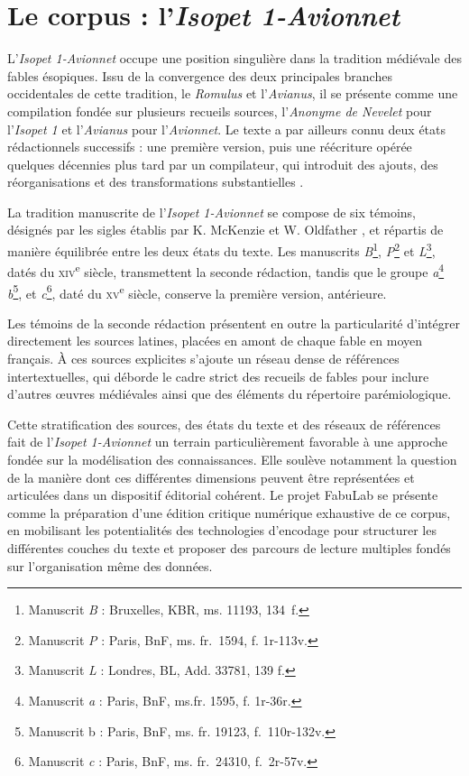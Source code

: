 \documentclass[final,fra]{anthology-ch}         %
\begin{document}
\section{Le corpus : l'\emph{Isopet 1-Avionnet}}

L'\emph{Isopet 1-Avionnet} occupe une position singulière dans la
tradition médiévale des fables ésopiques.
Issu de la convergence des
deux principales branches occidentales de cette tradition, le
\emph{Romulus} et l'\emph{Avianus}, il se présente comme une compilation
fondée sur plusieurs recueils sources, l'\emph{Anonyme de Nevelet} pour
l'\emph{Isopet 1} et l'\emph{Avianus} pour l'\emph{Avionnet}.
Le texte a
par ailleurs connu deux états rédactionnels successifs : une première
version, puis une réécriture opérée quelques décennies plus tard par un
compilateur, qui introduit des ajouts, des réorganisations et des
transformations substantielles \cite{boivin2006naissance}.

La tradition manuscrite de l'\emph{Isopet 1-Avionnet} se compose de six
témoins, désignés par les sigles établis par K. McKenzie et W. Oldfather \cite{McKenzie_ysopet_1919}, et répartis de manière équilibrée entre les deux états du texte.
Les manuscrits \textit{B}\footnote{Manuscrit \textit{B} : Bruxelles, KBR, ms. 11193, 134~f.}, \textit{P}\footnote{Manuscrit \textit{P} : Paris, BnF, ms. fr.~1594, f. 1r-113v.}
et \textit{L}\footnote{Manuscrit \textit{L} : Londres, BL, Add. 33781, 139 f.}, datés du \textsc{xiv}\textsuperscript{e} siècle, transmettent la seconde rédaction, tandis
que le groupe
\textit{a}\footnote{Manuscrit \textit{a} : Paris, BnF, ms.fr. 1595, f. 1r-36r.}
\textit{b}\footnote{Manuscrit b : Paris, BnF, ms. fr. 19123, f.~110r-132v.}, 
et \textit{c}\footnote{Manuscrit \textit{c} : Paris, BnF, ms. fr.~24310, f.~2r-57v.}, 
daté du \textsc{xv}\textsuperscript{e} siècle, conserve la première version, antérieure.

Les témoins de la seconde rédaction présentent en outre la particularité
d'intégrer directement les sources latines, placées en amont de chaque
fable en moyen français.
À ces sources explicites s'ajoute un réseau
dense de références intertextuelles, qui déborde le cadre strict des
recueils de fables pour inclure d'autres œuvres médiévales ainsi que des
éléments du répertoire parémiologique.

Cette stratification des sources, des états du texte et des réseaux de
références fait de l'\emph{Isopet 1-Avionnet} un terrain
particulièrement favorable à une approche fondée sur la modélisation des
connaissances.
Elle soulève notamment la question de la manière dont ces
différentes dimensions peuvent être représentées et articulées dans un
dispositif éditorial cohérent.
Le projet FabuLab se présente comme la
préparation d'une édition critique numérique exhaustive de ce corpus, en
mobilisant les potentialités des technologies d'encodage pour structurer
les différentes couches du texte et proposer des parcours de lecture
multiples fondés sur l'organisation même des données.
\end{document}
